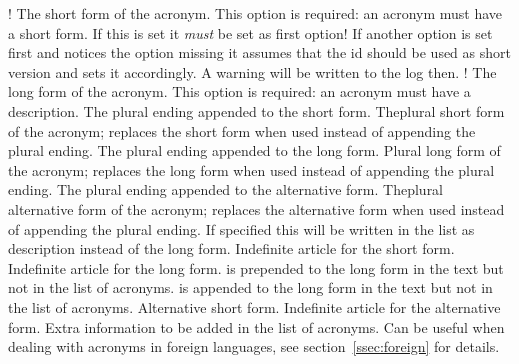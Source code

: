\documentclass[load-preamble+]{cnltx-doc}
\begin{document}
\begin{options}
  \Default!
    The short form of the acronym.  This option is required: an acronym must
    have a short form.  If this is set it \emph{must} be set as first option!
    If another option is set first and notices the  option
    missing it assumes that the \acs{id} should be used as short version and
    sets it accordingly.  A warning will be written to the log then.
  \Default!
    The long form of the acronym.  This option is required: an acronym must
    have a description.
    The plural ending appended to the short form.
    Theplural short form of the acronym; replaces the short
    form when used instead of appending the plural ending.
    The plural ending appended to the long form.
    Plural long form of the acronym; replaces the long form when used
    instead of appending the plural ending.
    The plural ending appended to the alternative form.
    Theplural alternative form of the acronym; replaces the
    alternative form when used instead of appending the plural ending.
    If specified this will be written in the list as description instead of
    the long form.
    Indefinite article for the short form.
    Indefinite article for the long form.
     is prepended to the long form in the text but not in the list
    of acronyms.
     is appended to the long form in the text but not in the list
    of acronyms.
    Alternative short form.
    Indefinite article for the alternative form.
    Extra information to be added in the list of acronyms.
    Can be useful when dealing with acronyms in foreign languages, see
    section~\vref{ssec:foreign} for details.

\end{options}
\end{document}
